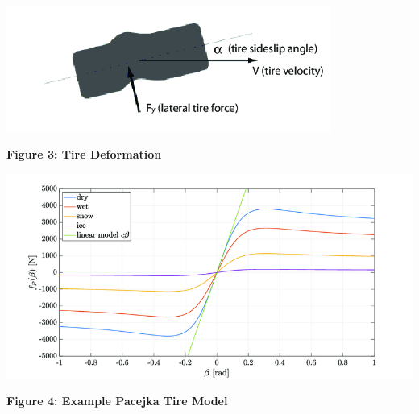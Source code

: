 \documentclass[12pt]{article}
\begin{document}



        

        \begin{center}
            \vspace{0.5cm}

            \includegraphics[width=0.8\textwidth]{resources/Lateral-tire-deformation.png}

            \vspace{0.5cm}

            \textbf{Figure 3: Tire Deformation} \autocite{inproceedings}
            \label{tire_deformation_2}
        
        \end{center}

        \begin{center}
            \vspace{0.5cm}

            \includegraphics[width=1\textwidth]{resources/Pacejkas-tire-model.png}

            \vspace{0.5cm}

            \textbf{Figure 4: Example Pacejka Tire Model} \autocite{pacejka}
            \label{pjka}
        
        \end{center}
\end{document}

